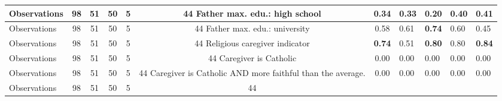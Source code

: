 \begin{tabular}{l c c c c c c }
\midrule
Observations &        98 &        51 &        50 &         5 &        44
Father max. edu.: high school &      0.34 &      0.33 & \textbf{     0.20} &      0.40 &      0.41 \\
\midrule
Observations &        98 &        51 &        50 &         5 &        44
Father max. edu.: university &      0.58 &      0.61 & \textbf{     0.74} &      0.60 &      0.45 \\
\midrule
Observations &        98 &        51 &        50 &         5 &        44
Religious caregiver indicator & \textbf{     0.74} &      0.51 & \textbf{     0.80} &      0.80 & \textbf{     0.84} \\
\midrule
Observations &        98 &        51 &        50 &         5 &        44
Caregiver is Catholic &      0.00 &      0.00 &      0.00 &      0.00 &      0.00 \\
\midrule
Observations &        98 &        51 &        50 &         5 &        44
Caregiver is Catholic AND more faithful than the average. &      0.00 &      0.00 &      0.00 &      0.00 &      0.00 \\
\midrule
Observations &        98 &        51 &        50 &         5 &        44
\bottomrule
\end{tabular}
